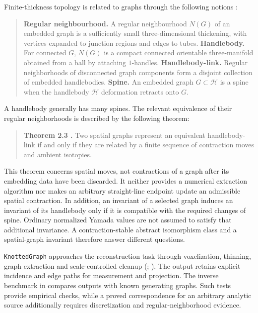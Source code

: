 Finite-thickness topology is related to graphs through the following notions \cite{kg_ishii2008handlebody,kg_ishii2012handlebody}:
\begin{quote}
\textbf{Regular neighbourhood.} A regular neighbourhood $N(G)$ of an embedded graph is a sufficiently small three-dimensional thickening, with vertices expanded to junction regions and edges to tubes.
\medskip
\noindent\textbf{Handlebody.} For connected $G$, $N(G)$ is a compact connected orientable three-manifold obtained from a ball by attaching $1$-handles.
\medskip
\noindent\textbf{Handlebody-link.} Regular neighborhoods of disconnected graph components form a disjoint collection of embedded handlebodies.
\medskip
\noindent\textbf{Spine.} An embedded graph $G\subset\mathcal H$ is a spine when the handlebody $\mathcal H$ deformation retracts onto $G$.
\end{quote}

A handlebody generally has many spines. The relevant equivalence of their regular neighborhoods is described by the following theorem:
\begin{quote}
\textbf{Theorem 2.3 \cite[Theorem~2.3]{kg_ishii2012handlebody}.}
Two spatial graphs represent an equivalent handlebody-link if and only if they are related by a finite sequence of contraction moves and ambient isotopies.
\end{quote}
This theorem concerns spatial moves, not contractions of a graph after its embedding data have been discarded. It neither provides a numerical extraction algorithm nor makes an arbitrary straight-line endpoint update an admissible spatial contraction. In addition, an invariant of a selected graph induces an invariant of its handlebody only if it is compatible with the required changes of spine. Ordinary normalized Yamada values are not assumed to satisfy that additional invariance. A contraction-stable abstract isomorphism class and a spatial-graph invariant therefore answer different questions.

\texttt{KnottedGraph} approaches the reconstruction task through voxelization, thinning, graph extraction and scale-controlled cleanup (; ). The output retains explicit incidence and edge paths for measurement and projection. The inverse benchmark in  compares outputs with known generating graphs. Such tests provide empirical checks, while a proved correspondence for an arbitrary analytic source additionally requires discretization and regular-neighborhood evidence.

